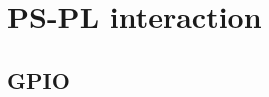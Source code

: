 \documentclass{article}
\begin{document}
{{%
%
%
%
%



\section{PS-PL interaction}

\subsection{GPIO}

}}
\end{document}
